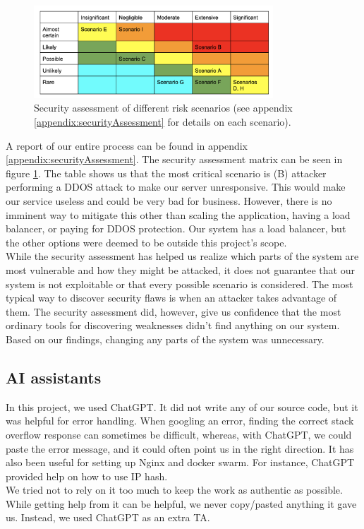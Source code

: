 \begin{figure}[H]
    \centering
    \includegraphics[width=0.8\textwidth]{images/securityAssessment.png}
    \caption{Security assessment of different risk scenarios (see appendix \ref{appendix:securityAssessment} for details on each scenario).}
    \label{fig:securityAssessmentTable}
\end{figure}

A report of our entire process can be found in appendix \ref{appendix:securityAssessment}. The security assessment matrix can be seen in figure \ref{fig:securityAssessmentTable}. The table shows us that the most critical scenario is (B) attacker performing a DDOS attack to make our server unresponsive. This would make our service useless and could be very bad for business. However, there is no imminent way to mitigate this other than scaling the application, having a load balancer, or paying for DDOS protection. Our system has a load balancer, but the other options were deemed to be outside this project's scope. \\

While the security assessment has helped us realize which parts of the system are most vulnerable and how they might be attacked, it does not guarantee that our system is not exploitable or that every possible scenario is considered. The most typical way to discover security flaws is when an attacker takes advantage of them. The security assessment did, however, give us confidence that the most ordinary tools for discovering weaknesses didn't find anything on our system. Based on our findings, changing any parts of the system was unnecessary.

\subsection{AI assistants}
In this project, we used ChatGPT. It did not write any of our source code, but it was helpful for error handling. When googling an error, finding the correct stack overflow response can sometimes be difficult, whereas, with ChatGPT, we could paste the error message, and it could often point us in the right direction. It has also been useful for setting up Nginx and docker swarm. For instance, ChatGPT provided help on how to use IP hash. \\

We tried not to rely on it too much to keep the work as authentic as possible. While getting help from it can be helpful, we never copy/pasted anything it gave us. Instead, we used ChatGPT as an extra TA.
